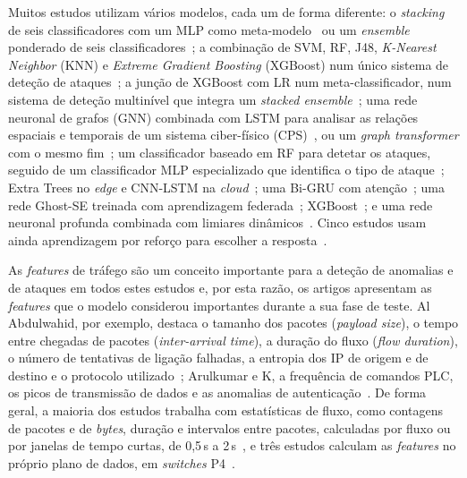 \documentclass[conference,a4paper]{IEEEtran}
\begin{document}
Muitos estudos utilizam vários modelos, cada um de forma diferente: o
\textit{stacking} de seis classificadores com um MLP como
meta-modelo~\cite{elsayed2024mpguard} ou um \textit{ensemble} ponderado de seis
classificadores~\cite{toony2024multiblock}; a combinação de SVM, RF, J48,
\textit{K-Nearest Neighbor} (KNN) e \textit{Extreme Gradient Boosting} (XGBoost) num único
sistema de deteção de ataques~\cite{Chaudhary2025}; a junção de XGBoost com LR num
meta-classificador, num sistema de deteção multinível que integra um \textit{stacked
ensemble}~\cite{Arulkumar2026}; uma rede neuronal de grafos (GNN) combinada com LSTM para analisar as relações espaciais
e temporais de um sistema ciber-físico (CPS)~\cite{Rasheed2026}, ou um \textit{graph
transformer} com o mesmo fim~\cite{shukla2026cyber}; um classificador baseado em RF para
detetar os ataques, seguido de um classificador MLP especializado que identifica o tipo
de ataque~\cite{Iqbal2026}; Extra Trees no \textit{edge} e CNN-LSTM na
\textit{cloud}~\cite{srilekha2025hybrid}; uma Bi-GRU com atenção~\cite{kumar2025advanced}; uma
rede Ghost-SE treinada com aprendizagem federada~\cite{gowtham2026fedmp}; XGBoost~\cite{karibandi2025cyberdome};
e uma rede neuronal profunda combinada com limiares
dinâmicos~\cite{hunde2026rankshield}. Cinco estudos usam ainda
aprendizagem por reforço para escolher a
resposta~\cite{zolotukhin2021curious,gowtham2026fedmp,premakumari2025qlearning,kumar2025advanced,Arulkumar2026}.

As \textit{features} de tráfego são um conceito importante para a deteção de anomalias e
de ataques em todos estes estudos e, por esta razão, os artigos apresentam as
\textit{features} que o modelo considerou importantes durante a sua fase de teste.
Al Abdulwahid, por exemplo, destaca o tamanho dos
pacotes (\textit{payload size}), o tempo entre chegadas de pacotes
(\textit{inter-arrival time}), a duração do fluxo (\textit{flow duration}), o número de
tentativas de ligação falhadas, a entropia dos IP de origem e de destino e o protocolo
utilizado~\cite{Abdulwahid2025}; Arulkumar e K, a frequência de comandos PLC, os picos de
transmissão de dados e as anomalias de autenticação~\cite{Arulkumar2026}. De forma geral, a maioria dos estudos trabalha com
estatísticas de fluxo, como contagens de pacotes e de \textit{bytes}, duração e intervalos
entre pacotes, calculadas por fluxo ou por janelas de tempo curtas, de 0,5\,s a
2\,s~\cite{ravi2020semisupervised,elsayed2024mpguard}, e três estudos calculam as
\textit{features} no próprio plano de dados, em \textit{switches}
P4~\cite{ramirezmartinez2025p4,andrade2024ddos,elsayed2024mpguard}.
\end{document}
